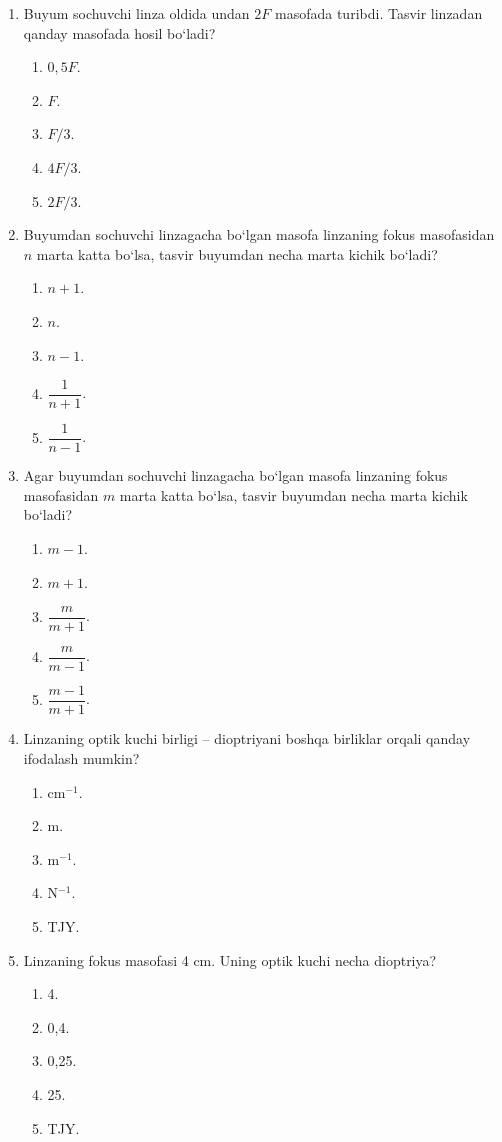 \begin{enumerate}
\item Buyum sochuvchi linza oldida undan $2F$ masofada turibdi. Tasvir linzadan qanday masofada hosil bo‘ladi?
\begin{enumerate}[label=\Alph*)]
\item $0{,}5F$.
\item $F$.
\item $F/3$.
\item $4F/3$.
\item $2F/3$.
\end{enumerate}

\item Buyumdan sochuvchi linzagacha bo‘lgan masofa linzaning fokus masofasidan $n$ marta katta bo‘lsa, tasvir buyumdan necha marta kichik bo‘ladi?
\begin{enumerate}[label=\Alph*)]
\item $n+1$.
\item $n$.
\item $n-1$.
\item $\dfrac1{n+1}$.
\item $\dfrac1{n-1}$.
\end{enumerate}

\item Agar buyumdan sochuvchi linzagacha bo‘lgan masofa linzaning fokus masofasidan $m$ marta katta bo‘lsa, tasvir buyumdan necha marta kichik bo‘ladi?
\begin{enumerate}[label=\Alph*)]
\item $m-1$.
\item $m+1$.
\item $\dfrac{m}{m+1}$.
\item $\dfrac{m}{m-1}$.
\item $\dfrac{m-1}{m+1}$.
\end{enumerate}

\item Linzaning optik kuchi birligi – dioptriyani boshqa birliklar orqali qanday ifodalash mumkin?
\begin{enumerate}[label=\Alph*)]
\item cm$^{-1}$.
\item m.
\item m$^{-1}$.
\item N$^{-1}$.
\item TJY.
\end{enumerate}

\item Linzaning fokus masofasi 4 cm. Uning optik kuchi necha dioptriya?
\begin{enumerate}[label=\Alph*)]
\item 4.
\item 0,4.
\item 0,25.
\item 25.
\item TJY.
\end{enumerate}


\end{enumerate}
